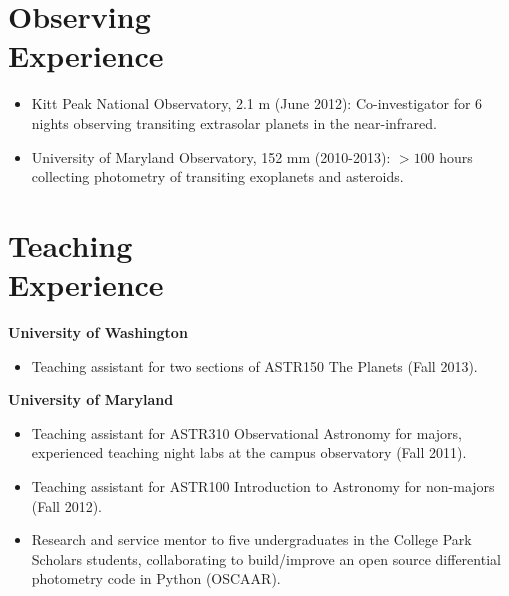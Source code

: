 \documentclass[margin]{res}
\begin{document}
\begin{resume}
\section{Observing \\Experience}
            \begin{itemize}   
            \item Kitt Peak National Observatory, 2.1 m (June 2012): Co-investigator for 6 nights observing transiting extrasolar planets in the near-infrared.
            \item University of Maryland Observatory, 152 mm (2010-2013): $>100$ hours collecting photometry of transiting exoplanets and asteroids. \\
            \end{itemize}
                 
\section{Teaching \\Experience}
	     \textbf{University of Washington}
            \begin{itemize}   
            \item Teaching assistant for two sections of ASTR150 The Planets (Fall 2013). 
            \end{itemize}
	     \textbf{University of Maryland}
            \begin{itemize}   
            \item Teaching assistant for ASTR310 Observational Astronomy for majors, experienced teaching night labs at the campus observatory (Fall 2011).
            \item Teaching assistant for ASTR100 Introduction to Astronomy for non-majors (Fall 2012).
            \item Research and service mentor to five undergraduates in the College Park Scholars students, collaborating to build/improve an open source differential photometry code in Python (OSCAAR). \\
            \end{itemize}
            

\end{resume}
\end{document}
